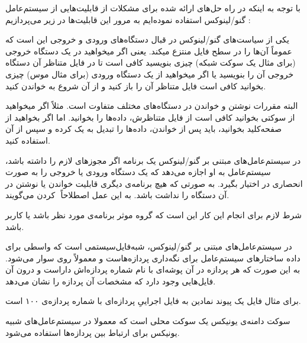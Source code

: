 
با توجه به اینکه در راه حل‌های ارائه شده برای مشکلات از قابلیت‌هایی از سیستم‌عامل گنو/لینوکس استفاده نموده‌ایم به مرور این قابلیت‌ها در زیر می‌پردازیم :

یکی از سیاست‌های گنو/لینوکس در قبال دستگاه‌های ورودی و خروجی این است که عموماً آن‌ها را در سطح فایل منتزع میکند. یعنی اگر میخواهید در یک دستگاه خروجی (برای مثال یک سوکت شبکه) چیزی بنویسید کافی است تا در فایل متناظر آن دستگاه خروجی آن را بنویسید یا اگر میخواهید از یک دستگاه ورودی (برای مثال موس) چیزی بخوانید کافی است فایل متناظر آن را باز کنید و از آن شروع به خواندن کنید.

البته مقررات نوشتن و خواندن در دستگاه‌های مختلف متفاوت است. مثلاً اگر میخواهید از سوکتی بخوانید کافی است از فایل متناظرش، داده‌ها را بخوانید. اما اگر بخواهید از صفحه‌کلید بخوانید، باید پس از خواندن، داده‌ها را تبدیل به یک  کرده و سپس از آن استفاده کنید.

در سیستم‌عامل‌های مبتنی بر گنو/لینوکس یک برنامه اگر مجوز‌های لازم را داشته باشد، سیستم‌عامل به او اجازه می‌دهد که یک دستگاه ورودی یا خروجی را به صورت انحصاری در اختیار بگیرد. به صورتی که هیچ برنامه‌ی دیگری قابلیت خواندن یا نوشتن در آن دستگاه را نداشت باشد. به این عمل اصطلاحاً ‌ کردن می‌گویند. 

شرط لازم برای انجام این کار این است که گروه موثر برنامه‌ی مورد نظر  باشد یا کاربر  باشد.


در سیستم‌عامل‌های مبتنی بر گنو/لینوکس،  شبه‌فایل‌سیستمی است که واسطی برای داده ساختارهای سیستم‌عامل برای نگه‌داری پردازه‌هاست و معمولاً روی  سوار می‌شود. به این صورت که هر پردازه در آن پوشه‌ای با نام شماره پردازه‌اش داراست و درون آن فایل‌هایی وجود دارد که مشخصات آن پردازه را نشان می‌دهد.

برای مثال فایل  یک پیوند نمادین به فایل اجراییِ پردازه‌ای با شماره پردازه‌ی ۱۰۰ است. 

سوکت دامنه‌ی یونیکس یک سوکت محلی است که معمولا در سیستم‌عامل‌های شبیه یونیکس برای ارتباط بین پردازه‌ها  استفاده می‌شود. 

